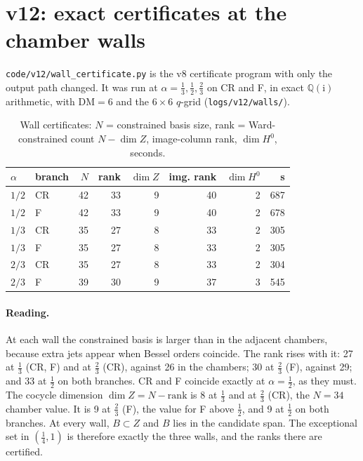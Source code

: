 \documentclass[11pt,a4paper]{article}
\newcommand{\ii}{\mathrm i}
\newcommand{\loc}[1]{\nolinkurl{#1}}
\theoremstyle{plain}
\theoremstyle{definition}
\theoremstyle{remark}
\numberwithin{equation}{section}
\begin{document}
\section{v12: exact certificates at the chamber walls}
\label{sec:v12walls}

\loc{code/v12/wall_certificate.py} is the v8 certificate program
with only the output path changed. It was run at
\(\alpha=\tfrac13,\tfrac12,\tfrac23\) on CR and F, in exact
\(\mathbb Q(\ii)\) arithmetic, with \(\mathrm{DM}=6\) and the
\(6\times6\) \(q\)-grid (\loc{logs/v12/walls/}).

\begin{center}
\small
\begin{longtable}{@{}llrrrrrr@{}}
\caption{Wall certificates: \(N\) = constrained basis size, rank = Ward-constrained count \(N-\dim Z\), image-column rank, \(\dim H^0\), seconds.}\label{tab:v12walls}\\
\toprule
\(\alpha\) & branch & \(N\) & rank & \(\dim Z\) & img. rank & \(\dim H^0\) & s\\
\midrule
\(1/2\) & CR & 42 & 33 & 9 & 40 & 2 & 687\\
\(1/2\) & F & 42 & 33 & 9 & 40 & 2 & 678\\
\(1/3\) & CR & 35 & 27 & 8 & 33 & 2 & 305\\
\(1/3\) & F & 35 & 27 & 8 & 33 & 2 & 305\\
\(2/3\) & CR & 35 & 27 & 8 & 33 & 2 & 304\\
\(2/3\) & F & 39 & 30 & 9 & 37 & 3 & 545\\
\bottomrule
\end{longtable}
\end{center}

\paragraph{Reading.} At each wall the constrained basis is larger
than in the adjacent chambers, because extra jets appear when Bessel
orders coincide. The rank rises with it: 27 at \(\tfrac13\) (CR, F)
and at \(\tfrac23\) (CR), against 26 in the chambers; 30 at
\(\tfrac23\) (F), against 29; and 33 at \(\tfrac12\) on both
branches. CR and F coincide exactly at \(\alpha=\tfrac12\), as they
must. The cocycle dimension \(\dim Z=N-\mathrm{rank}\) is 8 at
\(\tfrac13\) and at \(\tfrac23\) (CR), the \(N=34\) chamber value.
It is 9 at \(\tfrac23\) (F), the value for F above \(\tfrac12\), and
9 at \(\tfrac12\) on both branches. At every wall, \(B\subset Z\)
and \(B\) lies in the candidate span. The exceptional set in
\((\tfrac14,1)\) is therefore exactly the three walls, and the ranks
there are certified.
\end{document}
